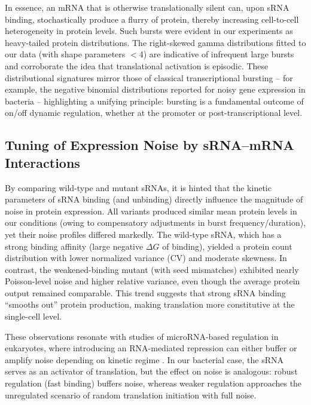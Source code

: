 In essence, an mRNA that is otherwise translationally silent can, upon sRNA binding, stochastically produce a flurry of protein, thereby increasing cell-to-cell heterogeneity in protein levels. Such bursts were evident in our experiments as heavy-tailed protein distributions. The right-skewed gamma distributions fitted to our data (with shape parameters $<$4) are indicative of infrequent large bursts and corroborate the idea that translational activation is episodic. These distributional signatures mirror those of classical transcriptional bursting -- for example, the negative binomial distributions reported for noisy gene expression in bacteria -- highlighting a unifying principle: bursting is a fundamental outcome of on/off dynamic regulation, whether at the promoter or post-transcriptional level.

\subsection*{Tuning of Expression Noise by sRNA--mRNA Interactions}
By comparing wild-type and mutant sRNAs, it is hinted that the kinetic parameters of sRNA binding (and unbinding) directly influence the magnitude of noise in protein expression. All variants produced similar mean protein levels in our conditions (owing to compensatory adjustments in burst frequency/duration), yet their noise profiles differed markedly. The wild-type sRNA, which has a strong binding affinity (large negative $\Delta G$ of binding), yielded a protein count distribution with lower normalized variance (CV) and moderate skewness. In contrast, the weakened-binding mutant (with seed mismatches) exhibited nearly Poisson-level noise and higher relative variance, even though the average protein output remained comparable. This trend suggests that strong sRNA binding ``smooths out'' protein production, making translation more constitutive at the single-cell level. %


These observations resonate with studies of microRNA-based regulation in eukaryotes, where introducing an RNA-mediated repression can either buffer or amplify noise depending on kinetic regime \cite{Schmiedel2015}. In our bacterial case, the sRNA serves as an activator of translation, but the effect on noise is analogous: robust regulation (fast binding) buffers noise, whereas weaker regulation approaches the unregulated scenario of random translation initiation with full noise.


